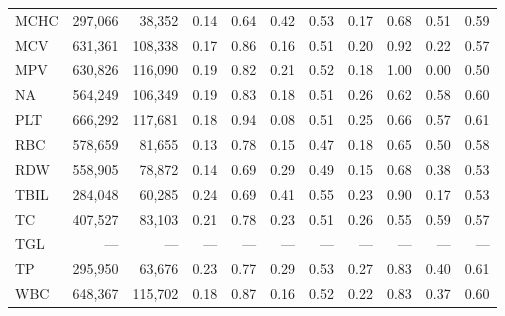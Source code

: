 \begin{table}[ht]
\begin{tabular}{lrrrrrrrrrr}
MCHC & 297,066 & 38,352 & 0.14 & 0.64 & 0.42 & 0.53 & 0.17 & 0.68 & 0.51 & 0.59 \\
MCV & 631,361 & 108,338 & 0.17 & 0.86 & 0.16 & 0.51 & 0.20 & 0.92 & 0.22 & 0.57 \\
MPV & 630,826 & 116,090 & 0.19 & 0.82 & 0.21 & 0.52 & 0.18 & 1.00 & 0.00 & 0.50 \\
NA & 564,249 & 106,349 & 0.19 & 0.83 & 0.18 & 0.51 & 0.26 & 0.62 & 0.58 & 0.60 \\
PLT & 666,292 & 117,681 & 0.18 & 0.94 & 0.08 & 0.51 & 0.25 & 0.66 & 0.57 & 0.61 \\
RBC & 578,659 & 81,655 & 0.13 & 0.78 & 0.15 & 0.47 & 0.18 & 0.65 & 0.50 & 0.58 \\
RDW & 558,905 & 78,872 & 0.14 & 0.69 & 0.29 & 0.49 & 0.15 & 0.68 & 0.38 & 0.53 \\
TBIL & 284,048 & 60,285 & 0.24 & 0.69 & 0.41 & 0.55 & 0.23 & 0.90 & 0.17 & 0.53 \\
TC & 407,527 & 83,103 & 0.21 & 0.78 & 0.23 & 0.51 & 0.26 & 0.55 & 0.59 & 0.57 \\
TGL & --- & --- & --- & --- & --- & --- & --- & --- & --- & --- \\
TP & 295,950 & 63,676 & 0.23 & 0.77 & 0.29 & 0.53 & 0.27 & 0.83 & 0.40 & 0.61 \\
WBC & 648,367 & 115,702 & 0.18 & 0.87 & 0.16 & 0.52 & 0.22 & 0.83 & 0.37 & 0.60 \\
\bottomrule
\end{tabular}
\label{tab:chs_eval_anemia_unspecified}
\end{table}